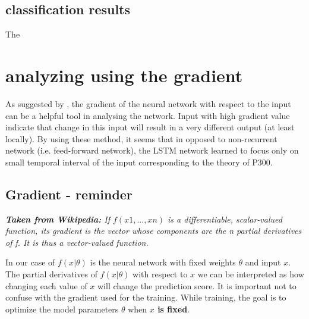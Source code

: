 \documentclass[]{report}
\begin{document}
\subsection{classification results}

The 
%
%


\section{analyzing using the gradient}
As suggested by \cite{AlexGraveBook}, the gradient of the neural network with respect to the input can be a helpful tool in analysing the network. Input with high gradient value indicate that change in this input will result in a very different output (at least locally). By using these method, it seems that in opposed to non-recurrent network (i.e. feed-forward network), the LSTM network learned to focus only on small temporal interval of the input corresponding to the theory of P300. 


\subsection{Gradient - reminder}
\textit{\textbf{Taken from Wikipedia: } If $f(x1, ..., xn)$ is a differentiable, scalar-valued function, its gradient is the vector whose components are the n partial derivatives of f. It is thus a vector-valued function.}

In our case of $f(x|\theta)$ is the neural network with fixed weights $\theta$ and input $x$. The partial derivatives of $f(x|\theta)$ with respect to $x$ we can be interpreted as how changing each value of $x$ will change the prediction score. It is important not to confuse with the gradient used for the training. While training, the goal is to  optimize the model parameters $\theta$ when \textbf{$x$ is fixed}.
\end{document}
